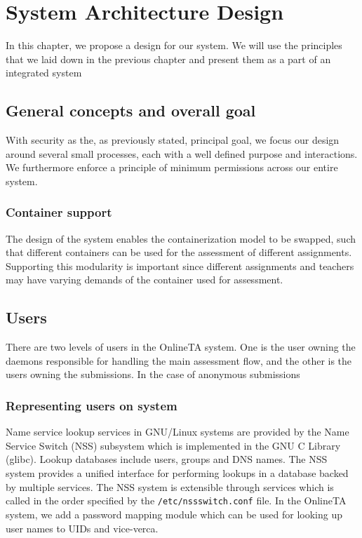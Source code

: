 \chapter{System Architecture Design}
In this chapter, we propose a design for our system. We will use the
principles that we laid down in the previous chapter and present them
as a part of an integrated system

\section{General concepts and overall goal}
With security as the, as previously stated, principal goal, we focus
our design around several small processes, each with a well defined
purpose and interactions. We furthermore enforce a principle of
minimum permissions across our entire system.

\subsection{Container support}
The design of the system enables the containerization model to be
swapped, such that different containers can be used for the assessment
of different assignments. Supporting this modularity is important
since different assignments and teachers may have varying demands of
the container used for assessment.

\section{Users}
There are two levels of users in the OnlineTA system. One is the user
owning the daemons responsible for handling the main assessment flow,
and the other is the users owning the submissions. In the case of
anonymous submissions

\subsection{Representing users on system}
Name service lookup services in GNU/Linux systems are provided by the
Name Service Switch (NSS) subsystem which is implemented in the GNU
C Library (glibc). Lookup databases include users, groups and DNS
names. The NSS system provides a unified interface for performing
lookups in a database backed by multiple services. The NSS system is
extensible through services which is called in the order specified by
the \texttt{/etc/nssswitch.conf} file. In the OnlineTA system, we add a
password mapping module which can be used for looking up user names to
UIDs and vice-verca\cite{nss}.

